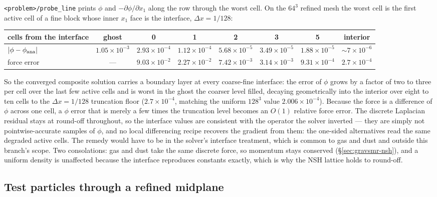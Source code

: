 \documentclass[11pt]{article}
\newcommand{\code}[1]{\texttt{#1}}
\begin{document}
\code{<problem>/probe\_line} prints $\phi$ and $-\partial\phi/\partial x_1$ along the row
through the worst cell. On the $64^3$ refined mesh the worst cell is the first active cell
of a fine block whose inner $x_1$ face is the interface, $\Delta x = 1/128$:

\begin{center}
\small
\begin{tabular}{@{}lccccccc@{}}
\toprule
cells from the interface & ghost & 0 & 1 & 2 & 3 & 5 & interior \\
\midrule
$|\phi - \phi_{\rm ana}|$   & $1.05\!\times\!10^{-3}$ & $2.93\!\times\!10^{-4}$
  & $1.12\!\times\!10^{-4}$ & $5.68\!\times\!10^{-5}$ & $3.49\!\times\!10^{-5}$
  & $1.88\!\times\!10^{-5}$ & $\sim\!7\!\times\!10^{-6}$ \\
force error & --- & $9.03\!\times\!10^{-2}$ & $2.27\!\times\!10^{-2}$
  & $7.42\!\times\!10^{-3}$ & $3.14\!\times\!10^{-3}$ & $9.31\!\times\!10^{-4}$
  & $2.7\!\times\!10^{-4}$ \\
\bottomrule
\end{tabular}
\end{center}

So the converged composite solution carries a boundary layer at every coarse-fine
interface: the error of $\phi$ grows by a factor of two to three per cell over the last
few active cells and is worst in the ghost the coarser level filled, decaying
geometrically into the interior over eight to ten cells to the $\Delta x = 1/128$
truncation floor ($2.7\times10^{-4}$, matching the uniform $128^3$ value
$2.006\times10^{-4}$). Because the force is a difference of $\phi$ across one cell, a
$\phi$ error that is merely a few times the truncation level becomes an $O(1)$ relative
force error. The discrete Laplacian residual stays at round-off throughout, so the
interface values are consistent with the operator the solver inverted --- they are simply
not pointwise-accurate samples of $\phi$, and no local differencing recipe recovers the
gradient from them: the one-sided alternatives read the same degraded active cells. The
remedy would have to be in the solver's interface treatment, which is common to gas and
dust and outside this branch's scope. Two consolations: gas and dust take the same
discrete force, so momentum stays conserved (\S\ref{sec:gravsmr-nsh}), and a uniform
density is unaffected because the interface reproduces constants exactly, which is why
the NSH lattice holds to round-off.

\subsection{Test particles through a refined midplane}
\end{document}
